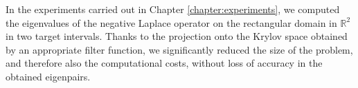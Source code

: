 \documentclass[a4paper,11pt,bibliography=totoc,listof=totoc,headinclude=true,cleardoublepage=empty,oneside]{scrbook}
\newcommand{\R}{\mathbb{R}}
\begin{document}
In the experiments carried out in Chapter \ref{chapter:experiments}, we computed the eigenvalues of the negative Laplace operator on the rectangular domain in $\R^2$ in two target intervals. Thanks to the projection onto the Krylov space obtained by an appropriate filter function, we significantly reduced the size of the problem, and therefore also the computational costs, without loss of accuracy in the obtained eigenpairs. 

 
%

\end{document}
